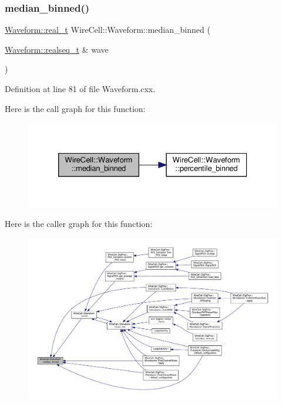 \subsubsection{\texorpdfstring{median\+\_\+binned()}{median\_binned()}}
{\footnotesize\ttfamily \hyperlink{namespace_wire_cell_1_1_waveform_a47570354e4599d8387803188186aba1f}{Waveform\+::real\+\_\+t} Wire\+Cell\+::\+Waveform\+::median\+\_\+binned (\begin{DoxyParamCaption}\item[{\hyperlink{namespace_wire_cell_1_1_waveform_a479175e541c8545e87cd8063b74b6956}{Waveform\+::realseq\+\_\+t} \&}]{wave }\end{DoxyParamCaption})}



Definition at line 81 of file Waveform.\+cxx.

Here is the call graph for this function\+:
\nopagebreak
\begin{figure}[H]
\begin{center}
\leavevmode
\includegraphics[width=326pt]{namespace_wire_cell_1_1_waveform_a9a72f0b40ec9e5b44713c59f338f6fd3_cgraph}
\end{center}
\end{figure}
Here is the caller graph for this function\+:
\nopagebreak
\begin{figure}[H]
\begin{center}
\leavevmode
\includegraphics[width=350pt]{namespace_wire_cell_1_1_waveform_a9a72f0b40ec9e5b44713c59f338f6fd3_icgraph}
\end{center}
\end{figure}
\mbox{\label{namespace_wire_cell_1_1_waveform_a992189c16e04b7302539d42c94f9e296}} 
